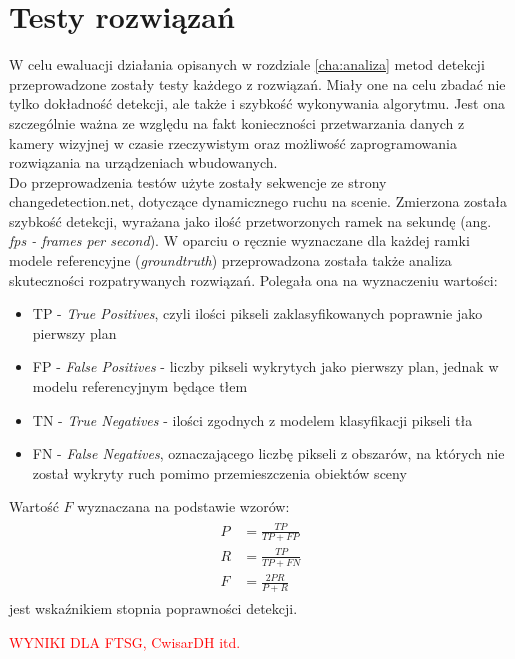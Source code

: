 \chapter{Testy rozwiązań}
\label{cha:testy}
\renewcommand{\tablename}{Tabela}

W celu ewaluacji działania opisanych w rozdziale \ref{cha:analiza} metod detekcji przeprowadzone zostały testy każdego z rozwiązań. Miały one na celu zbadać nie tylko dokładność detekcji, ale także i szybkość wykonywania algorytmu. Jest ona szczególnie ważna ze względu na fakt konieczności przetwarzania danych z kamery wizyjnej w czasie rzeczywistym oraz możliwość zaprogramowania rozwiązania na urządzeniach wbudowanych. \\
Do przeprowadzenia testów użyte zostały sekwencje ze strony changedetection.net, dotyczące dynamicznego ruchu na scenie. Zmierzona została szybkość detekcji, wyrażana jako ilość przetworzonych ramek na sekundę (ang. \textit{fps - frames per second}). W oparciu o ręcznie wyznaczane dla każdej ramki modele referencyjne (\textit{groundtruth}) przeprowadzona została także analiza skuteczności rozpatrywanych rozwiązań. Polegała ona na wyznaczeniu wartości:
\begin{itemize}
\item TP - \textit{True Positives}, czyli ilości pikseli zaklasyfikowanych poprawnie jako pierwszy plan
\item FP - \textit{False Positives} - liczby pikseli wykrytych jako pierwszy plan, jednak w modelu referencyjnym będące tłem
\item TN - \textit{True Negatives} - ilości zgodnych z modelem klasyfikacji pikseli tła
\item FN - \textit{False Negatives}, oznaczającego liczbę pikseli z obszarów, na których nie został wykryty ruch pomimo przemieszczenia obiektów sceny
\end{itemize}
Wartość $F$ wyznaczana na podstawie wzorów:
\begin{align}
\begin{split}
P &= \frac{TP}{TP+FP} \\
R &= \frac{TP}{TP+FN} \\
F &= \frac{2PR}{P+R}
\end{split}
\end{align}
jest wskaźnikiem stopnia poprawności detekcji.
\\
\begin{LARGE}
\textcolor{red}{WYNIKI DLA FTSG, CwisarDH itd.}
\end{LARGE}

